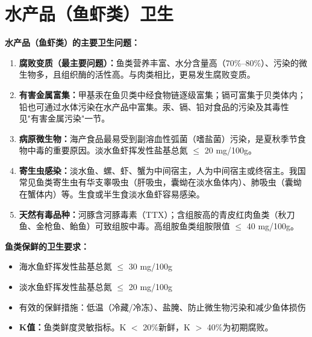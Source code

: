\section{水产品（鱼虾类）卫生}

\begin{defbox}
\textbf{水产品（鱼虾类）的主要卫生问题：}
\begin{enumerate}[leftmargin=*]
    \item \textbf{腐败变质（最主要问题）：}鱼类营养丰富、水分含量高（70\%--80\%）、污染的微生物多，且组织酶的活性高。与肉类相比，更易发生腐败变质。
    \item \textbf{有害金属富集：}甲基汞在鱼贝类中经食物链逐级富集；镉可富集于贝类体内；铅也可通过水体污染在水产品中富集。汞、镉、铅对食品的污染及其毒性见"有害金属污染"一节。
    \item \textbf{病原微生物：}海产食品最易受到副溶血性弧菌（嗜盐菌）污染，是夏秋季节食物中毒的重要原因。淡水鱼虾挥发性盐基总氮 $\leq$ 20 mg/100g。
    \item \textbf{寄生虫感染：}淡水鱼、螺、虾、蟹为中间宿主，人为中间宿主或终宿主。我国常见鱼类寄生虫有华支睾吸虫（肝吸虫，囊蚴在淡水鱼体内）、肺吸虫（囊蚴在蟹体内）等。生食或半生食淡水鱼虾容易感染。
    \item \textbf{天然有毒品种：}河豚含河豚毒素（TTX）；含组胺高的青皮红肉鱼类（秋刀鱼、金枪鱼、鲐鱼）可致组胺中毒。高组胺鱼类组胺限值 $\leq$ 40 mg/100g。
\end{enumerate}

\textbf{鱼类保鲜的卫生要求：}
\begin{itemize}[leftmargin=*]
    \item 海水鱼虾挥发性盐基总氮 $\leq$ 30 mg/100g
    \item 淡水鱼虾挥发性盐基总氮 $\leq$ 20 mg/100g
    \item 有效的保鲜措施：低温（冷藏/冷冻）、盐腌、防止微生物污染和减少鱼体损伤
    \item \textbf{K值：}鱼类鲜度灵敏指标。K $<$ 20\%新鲜，K $>$ 40\%为初期腐败。
\end{itemize}
\end{defbox}

